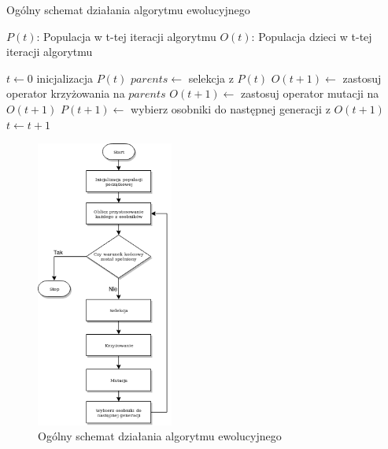 \begin{pseudokod}
\caption{Ogólny schemat działania algorytmu ewolucyjnego}
\label{alg_ewo}
    $P(t)$: Populacja w t-tej iteracji algorytmu\;
    $O(t)$: Populacja dzieci w t-tej iteracji algorytmu\;

    $t \gets 0$\;
    inicjalizacja $P(t)$\;
     {
        $parents \gets$ selekcja z $P(t)$\;
        $O(t+1) \gets$ zastosuj operator krzyżowania na $parents$\;
        $O(t+1) \gets$ zastosuj operator mutacji na $O(t+1)$\;
        $P(t+1) \gets$ wybierz osobniki do następnej generacji z $O(t+1)$\;
        $t \gets t+1$\;
    }
    \;
\end{pseudokod}

\begin{figure}[h]
    \centering        
    \includegraphics[width=0.4\textwidth]{img/alg_ewo_szkic.png}
    \caption{Ogólny schemat działania algorytmu ewolucyjnego}
    \label{alg_ewo_img}
\end{figure}

